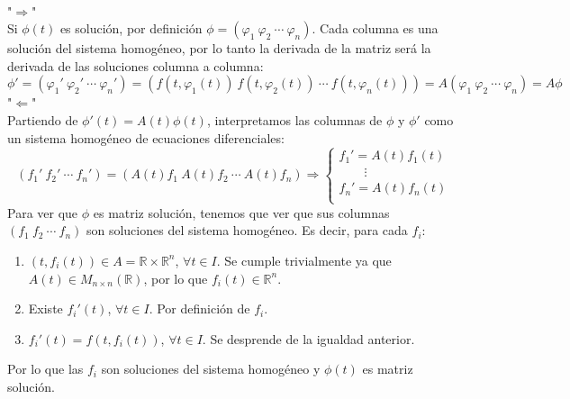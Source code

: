 \documentclass[11pt]{article}
\makeatletter
\theoremstyle{theorem-style}  %
\renewenvironment{proof}[1][\proofname]{\par
	\pushQED{\qed}%
	\normalfont \topsep6\p@\@plus6\p@\relax
	\list{}{%
		\settowidth{\leftmargin}{\quad:\hskip\labelsep}%
		\setlength{\labelwidth}{0pt}%
		\setlength{\itemindent}{-\leftmargin}%
	}%
	\item[\hskip\labelsep\itshape#1\@addpunct{:}]\ignorespaces
}{%
	\popQED\endlist\@endpefalse
}
\theoremstyle{definition-style}
\theoremstyle{example-style}
\makeatother
\begin{document}
\begin{proof}\ \\
	"$\Rightarrow $"\\
	Si $ \phi(t) $ es solución, por definición $ \phi=(\varphi_1 \ \varphi_2\  \cdots\  \varphi_n) $. Cada columna es una solución del sistema homogéneo, por lo tanto la derivada de la matriz será la derivada de las soluciones columna a columna:
	\[ \phi' = (\varphi_1' \ \varphi_2'\  \cdots\  \varphi_n')=(f(t,\varphi_1(t)) \ f(t,\varphi_2(t))\  \cdots\  f(t,\varphi_n(t)))=A(\varphi_1 \ \varphi_2\  \cdots\  \varphi_n)=A\phi \]
	"$\Leftarrow $"\\
	Partiendo de $ \phi'(t)=A(t)\phi(t) $, interpretamos las columnas de $ \phi $ y $ \phi' $ como un sistema homogéneo de ecuaciones diferenciales:
	\[ (f_1' \ f_2'\  \cdots\  f_n')=(A(t)f_1 \ A(t)f_2\  \cdots\  A(t)f_n)\Rightarrow \begin{cases}
	f_1'=A(t)f_1(t)\\
	\qquad \vdots\\
	f_n'=A(t)f_n(t)\\
	\end{cases} \]
	Para ver que $ \phi $ es matriz solución, tenemos que ver que sus columnas $ (f_1 \ f_2\  \cdots\  f_n) $ son soluciones del sistema homogéneo. Es decir, para cada $ f_i $:
	\begin{enumerate}[\quad i)]
		\item $(t, f_i (t)) \in A=\mathbb{R}\times \mathbb{R}^n$, $\forall t \in I$. Se cumple trivialmente ya que $ A(t)\in M_{n \times n} (\mathbb{R}) $, por lo que $ f_i(t)\in \mathbb{R}^n $.
		\item Existe $ f_i' (t)$, $\forall t \in I$. Por definición de $ f_i $.
		\item $f_i'(t)=f(t, f_i(t))$,  $\forall t \in I$. Se desprende de la igualdad anterior.
	\end{enumerate}
	Por lo que las $ f_i $ son soluciones del sistema homogéneo y $ \phi(t) $ es matriz solución.
\end{proof}
\end{document}
